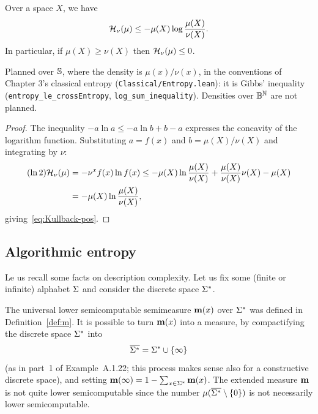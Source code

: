  \begin{proposition}\label{propo:Kullback-pos}
Over a space $X$, we have
 \begin{equation}\label{eq:Kullback-pos}
   \mathcal{H}_{\nu}(\mu) \le -\mu(X) \log\frac{\mu(X)}{\nu(X)}.
 \end{equation}
 In particular, if $\mu(X) \ge \nu(X)$ then $\mathcal{H}_{\nu}(\mu) \le 0$.
 \end{proposition}

\begin{formalization}
Planned over $\mathbb{S}$, where the density is $\mu(x)/\nu(x)$, in the conventions of Chapter 3's
classical entropy (\texttt{Classical/Entropy.lean}): it is Gibbs' inequality
(\texttt{entropy\_le\_crossEntropy}, \texttt{log\_sum\_inequality}). Densities over
$\mathbb{B}^{\mathbb{N}}$ are not planned.
\end{formalization}
 \begin{proof}
The inequality $- a \ln a \le -a\ln b + b-a$
expresses the concavity of the logarithm function.
Substituting $a = f(x)$ and $b = \mu(X)/\nu(X)$ 
and integrating by $\nu$:
 \begin{align*}
 (\ln 2) \mathcal{H}_{\nu}(\mu) &= 
 -\nu^{x} f(x) \ln f(x) \le -\mu(X) \ln\frac{\mu(X)}{\nu(X)}
  + \frac{\mu(X)}{\nu(X)} \nu(X) - \mu(X)
\\ &= -\mu(X) \ln\frac{\mu(X)}{\nu(X)},
 \end{align*}
giving~\eqref{eq:Kullback-pos}.
 \end{proof}

\subsection{Algorithmic entropy}

Le us recall some facts on description complexity.
Let us fix some (finite or infinite) 
alphabet $\Sigma$ and consider the discrete space $\Sigma^{*}$.

The universal lower semicomputable
semimeasure $\mathbf{m}(x)$ over $\Sigma^{*}$ was defined 
in Definition~\ref{def:m}.
It is possible to turn $\mathbf{m}(x)$ into a measure, by compactifying the
discrete space $\Sigma^{*}$ into 
 \[
  \overline{\Sigma^{*}}=\Sigma^{*}\cup\{\infty\}
 \]
(as in part~1 of Example~A.1.22;
this process makes sense also for a constructive discrete space),
and setting $\mathbf{m}(\infty) = 1-\sum_{x\in\Sigma^{*}} \mathbf{m}(x)$.
The extended measure $\mathbf{m}$ is not quite lower semicomputable since
the number $\mu(\overline{\Sigma^{*}} \setminus \{0\})$ is not necessarily
lower semicomputable.

